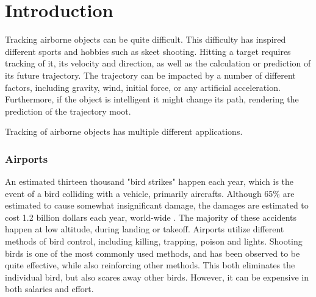 
\chapter{Introduction}

Tracking airborne objects can be quite difficult.
This difficulty has inspired different sports and hobbies such as skeet shooting.
Hitting a target requires tracking of it, its velocity and direction, as well as the calculation or prediction of its future trajectory.
The trajectory can be impacted by a number of different factors, including gravity, wind, initial force, or any artificial acceleration.
Furthermore, if the object is intelligent it might change its path, rendering the prediction of the trajectory moot.

Tracking of airborne objects has multiple different applications.

\subsection{Airports}
An estimated thirteen thousand "bird strikes" happen each year, which is the event of a bird colliding with a vehicle, primarily aircrafts\cite{WildlifeStrikeReport}.
Although 65\% are estimated to cause somewhat insignificant damage, the damages are estimated to cost 1.2 billion dollars each year, world-wide \cite{CostOfBirdstrikes}.
The majority of these accidents happen at low altitude, during landing or takeoff\cite{CostOfBirdstrikes}.
Airports utilize different methods of bird control, including killing, trapping, poison and lights\cite{BirdControlAtAirports}.
Shooting birds is one of the most commonly used methods, and has been observed to be quite effective, while also reinforcing other methods.
This both eliminates the individual bird, but also scares away other birds.
However, it can be expensive in both salaries and effort.

